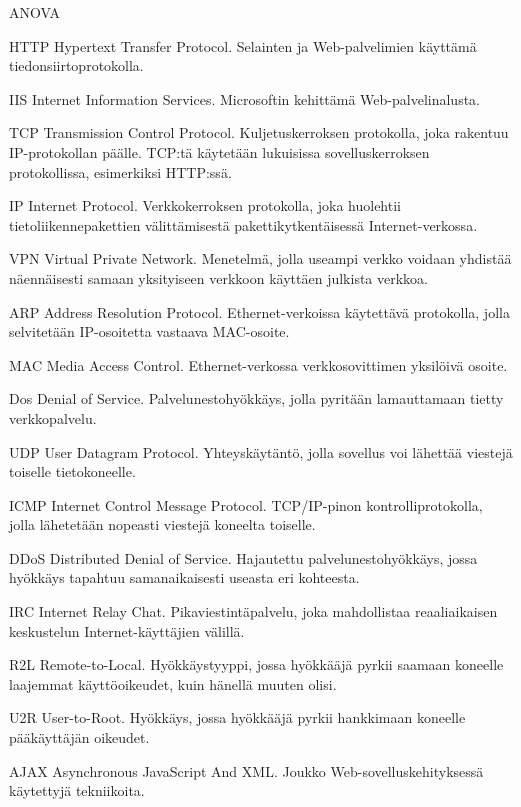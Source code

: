 
\termlist

\begin{abbrlist}{ANOVA}
\item[HTTP]     Hypertext Transfer Protocol. Selainten ja Web-palvelimien käyttämä tiedonsiirtoprotokolla.
\item[IIS]      Internet Information Services. Microsoftin kehittämä Web-palvelinalusta.
\item[TCP]	Transmission Control Protocol. Kuljetuskerroksen protokolla, joka rakentuu IP-protokollan päälle. TCP:tä käytetään lukuisissa sovelluskerroksen protokollissa, esimerkiksi HTTP:ssä.
\item[IP]	Internet Protocol. Verkkokerroksen protokolla, joka huolehtii tietoliikennepakettien välittämisestä pakettikytkentäisessä Internet-verkossa.
\item[VPN]	Virtual Private Network. Menetelmä, jolla useampi verkko voidaan yhdistää näennäisesti samaan yksityiseen verkkoon käyttäen julkista verkkoa. 
\item[ARP]	Address Resolution Protocol. Ethernet-verkoissa käytettävä protokolla, jolla selvitetään IP-osoitetta vastaava MAC-osoite.
\item[MAC]	Media Access Control. Ethernet-verkossa verkkosovittimen yksilöivä osoite.
\item[Dos]	Denial of Service. Palvelunestohyökkäys, jolla pyritään lamauttamaan tietty verkkopalvelu.
\item[UDP]	User Datagram Protocol. Yhteyskäytäntö, jolla sovellus voi lähettää viestejä toiselle tietokoneelle.
\item[ICMP]	Internet Control Message Protocol. TCP/IP-pinon kontrolliprotokolla, jolla lähetetään nopeasti viestejä koneelta toiselle.
\item[DDoS]	Distributed Denial of Service. Hajautettu palvelunestohyökkäys, jossa hyökkäys tapahtuu samanaikaisesti useasta eri kohteesta.
\item[IRC]	Internet Relay Chat. Pikaviestintäpalvelu, joka mahdollistaa reaaliaikaisen keskustelun Internet-käyttäjien välillä.
\item[R2L]	Remote-to-Local. Hyökkäystyyppi, jossa hyökkääjä pyrkii saamaan koneelle laajemmat käyttöoikeudet, kuin hänellä muuten olisi.
\item[U2R]	User-to-Root. Hyökkäys, jossa hyökkääjä pyrkii hankkimaan koneelle pääkäyttäjän oikeudet.
\item[AJAX]	Asynchronous JavaScript And XML. Joukko Web-sovelluskehityksessä käytettyjä tekniikoita.

\end{abbrlist}
